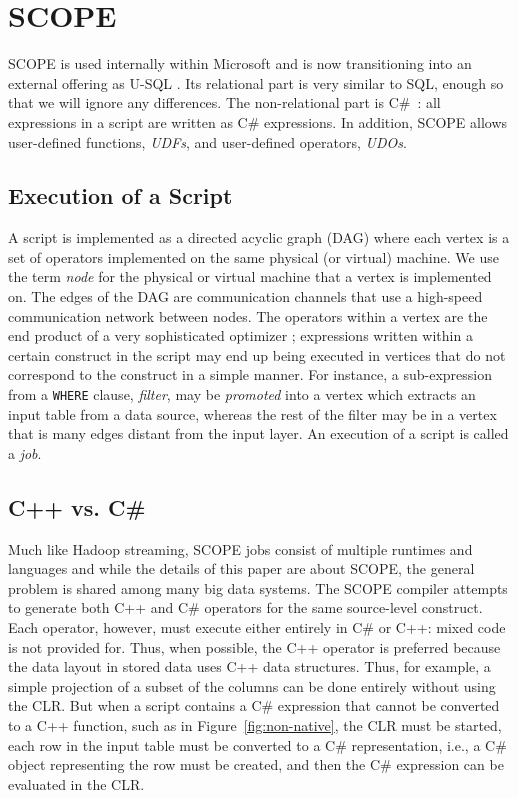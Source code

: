 \section{SCOPE \label{sec:Scope}}

SCOPE \cite{} is used internally within Microsoft and is now transitioning into an external offering as U-SQL \cite{}.
Its relational part is very similar to SQL, enough so that we will ignore any differences.
The non-relational part is C\#~\cite{Hejlsberg:2010:CPL:1951915}: all expressions in a script are written as C\# expressions.
In addition, SCOPE allows user-defined functions, {\em UDFs}, and user-defined operators, {\em UDOs}.

\subsection{Execution of a Script}
A script is implemented as a directed acyclic graph (DAG) where each vertex is a set of operators implemented on the same physical (or virtual) machine. We use the term {\it node} for the physical or virtual machine that a vertex is implemented on.
The edges of the DAG are communication channels that use a high-speed communication network between nodes.
The operators within a vertex are the end product of a very sophisticated optimizer \cite{}; expressions written within a certain construct in the script may end up being executed in vertices that do not correspond to the construct in a simple manner.
For instance, a sub-expression from a {\tt WHERE} clause, {\em filter}, may be {\it promoted} into a vertex which extracts an input table from a data source, whereas the rest of the filter may be in a vertex that is many edges distant from the input layer.
An execution of a script is called a {\em job}.

\subsection{C++ vs. C\#}
Much like Hadoop streaming, SCOPE jobs consist of multiple runtimes and languages and while the details of this paper are about SCOPE, the general problem is shared among many big data systems.
The SCOPE compiler attempts to generate both C++ and C\# operators for the same source-level construct.
Each operator, however, must execute either entirely in C\# or C++: mixed code is not provided for.
Thus, when possible, the C++ operator is preferred because the data layout in stored data uses C++ data structures.
Thus, for example, a simple projection of a subset of the columns can be done entirely
without using the CLR.
But when a script contains a C\# expression that cannot be converted to a C++ function, such as in Figure~\ref{fig:non-native}, the CLR must be started, each row in the input table must be converted to a C\# representation, i.e., a C\# object representing the row must be created, and then the C\# expression can be evaluated in the CLR.

